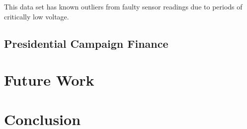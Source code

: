 \documentclass{vldb}
\begin{document}
This data set has known outliers from faulty sensor readings due to periods of critically low voltage.

\subsection{Presidential Campaign Finance}
\cite{PresCampaignData}

\section{Future Work}
\section{Conclusion}






\end{document}
